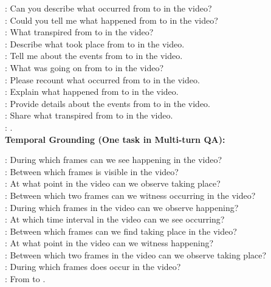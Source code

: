 \documentclass[10pt,twocolumn,letterpaper]{article}
\begin{document}
\begin{figure*}[t]
\begin{tcolorbox}[colback=gray!20, colframe=black, text width=0.9\textwidth, title={Box 3: Templates to transform events  into QA dialogues, 10 templates for each task.}]
: Can you describe what occurred from \textcolor{blue}{} to \textcolor{blue}{} in the video? \\ 
: Could you tell me what happened from \textcolor{blue}{} to \textcolor{blue}{} in the video? \\ 
: What transpired from \textcolor{blue}{} to \textcolor{blue}{} in the video? \\ 
: Describe what took place from \textcolor{blue}{} to \textcolor{blue}{} in the video. \\ 
: Tell me about the events from \textcolor{blue}{} to \textcolor{blue}{} in the video. \\ 
: What was going on from \textcolor{blue}{} to \textcolor{blue}{} in the video? \\ 
: Please recount what occurred from \textcolor{blue}{} to \textcolor{blue}{} in the video. \\ 
: Explain what happened from \textcolor{blue}{} to \textcolor{blue}{} in the video. \\ 
: Provide details about the events from \textcolor{blue}{} to \textcolor{blue}{} in the video. \\ 
: Share what transpired from \textcolor{blue}{} to \textcolor{blue}{} in the video. \\
: \textcolor{blue}{}. \\

\textbf{Temporal Grounding (One task in Multi-turn QA):}

: During which frames can we see \textcolor{blue}{} happening in the video? \\ 
: Between which frames is \textcolor{blue}{} visible in the video? \\ 
: At what point in the video can we observe \textcolor{blue}{} taking place? \\ 
: Between which two frames can we witness \textcolor{blue}{} occurring in the video? \\ 
: During which frames in the video can we observe \textcolor{blue}{} happening? \\ 
: At which time interval in the video can we see \textcolor{blue}{} occurring? \\ 
: Between which frames can we find \textcolor{blue}{} taking place in the video? \\ 
: At what point in the video can we witness \textcolor{blue}{} happening? \\ 
: Between which two frames in the video can we observe \textcolor{blue}{} taking place? \\ 
: During which frames does \textcolor{blue}{} occur in the video? \\
: From \textcolor{blue}{} to \textcolor{blue}{}. \\



\end{tcolorbox}
\end{figure*}
\end{document}
